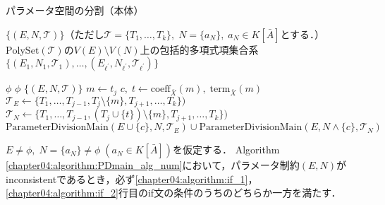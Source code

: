 \begin{algorithm}[htbp]
	\caption{パラメータ空間の分割（本体）}
	\label{chapter04:algorithm:PDmain_alg_num}
	\begin{algorithmic}[1]

		\Require $\{ (E, N, \mathscr{T}) \}$（ただし$\mathscr{T} = \{ T_1, \dots, T_k \}, \; N = \{ a_N \}, \; a_N \in K[\bar{A}]$とする．）
		\Ensure $\mathrm{PolySet}(\mathscr{T})$の$V(E) \setminus V(N)$上の包括的多項式項集合系$\{ (E_1, N_1, \mathscr{T}_1), \dots, (E_{\ell^\prime}, N_{\ell^\prime}, \mathscr{T}_{\ell^\prime})\}$

		 \label{chapter04:algorithm:if_1}
			\State \Return $\phi$
		\EndIf
		 \label{chapter04:algorithm:if_2}
			\State \Return $\phi$
		\EndIf
		 \label{chapter04:algorithm:if_3}
			\State \Return $\{ (E, N,\mathscr{T}) \}$
		\EndIf
		 \label{chapter04:algorithm:if_4}
			\State $m \gets t_j$
			\State $c, \; t \gets \mathrm{coeff}_{\bar{X}}(m), \; \mathrm{term}_{\bar{X}}(m)$
		\EndIf
		\State $\mathscr{T}_E \gets \{ T_1, \dots, T_{j-1}, T_j \setminus \{ m \}, T_{j+1}, \dots, T_k \})$ \label{chapter04:algorithm:TE}
		\State $\mathscr{T}_N \gets \{ T_1, \dots, T_{j-1}, (T_j \cup \{ t \}) \setminus \{ m \}, T_{j+1}, \dots, T_k \})$ \label{chapter04:algorithm:TN}
		\State \Return $\mathrm{ParameterDivisionMain}(E \cup \{ c \}, N, \mathscr{T}_E) \cup \mathrm{ParameterDivisionMain}(E, N \land \{ c \}, \mathscr{T}_N)$ \label{chapter04:algorithm:return}
		\EndFunction
	\end{algorithmic}
\end{algorithm}

\begin{lemma}
	\label{chapter04:lemma:for_alg_3}
	$E \ne \phi,\; N = \{a_N\} \ne \phi \;(a_N \in K[\bar{A}])$を仮定する．
	Algorithm \ref{chapter04:algorithm:PDmain_alg_num}において，パラメータ制約$(E, N)$がinconsistentであるとき，必ず\ref{chapter04:algorithm:if_1}，\ref{chapter04:algorithm:if_2}行目のif文の条件のうちのどちらか一方を満たす．
\end{lemma}

